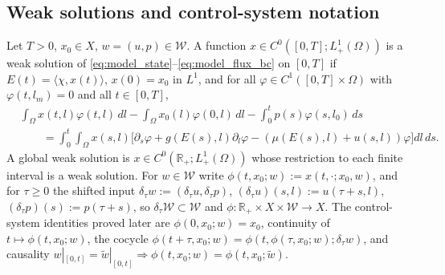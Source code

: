 \documentclass[a4paper,fleqn,longmktitle]{cas-sc}
\theoremstyle{plain}
\theoremstyle{definition}
\theoremstyle{remark}
\numberwithin{equation}{section}
\begin{document}
\subsection{Weak solutions and control-system notation}
\label{subsec:weak_solutions}
Let \(T>0\), \(x_0\in X\), \(w=(u,p)\in\mathcal W\). A function
\(x\in C^0([0,T];L^1_+(\Omega))\) is a weak solution of
\eqref{eq:model_state}--\eqref{eq:model_flux_bc} on \([0,T]\) if
\(E(t)=\langle\chi,x(t)\rangle\), \(x(0)=x_0\) in \(L^1\), and for all
\(\varphi\in C^1([0,T]\times\Omega)\) with \(\varphi(t,l_m)=0\) and all
\(t\in[0,T]\),
\begin{equation}
    \label{eq:model_weak_solution}
    \begin{aligned}
    &\int_\Omega x(t,l)\varphi(t,l)\,dl
    -
    \int_\Omega x_0(l)\varphi(0,l)\,dl
    -
    \int_0^t p(s)\varphi(s,l_0)\,ds
    \\
    &\qquad =
    \int_0^t\!\!\int_\Omega
    x(s,l)
    \big[
        \partial_s\varphi
        +
        g(E(s),l)\partial_l\varphi
        -
        (\mu(E(s),l)+u(s,l))\varphi
    \big]dl\,ds .
    \end{aligned}
\end{equation}
A global weak solution is \(x\in C^0(\mathbb R_+;L^1_+(\Omega))\) whose
restriction to each finite interval is a weak solution. For \(w\in\mathcal W\)
write \(\phi(t,x_0;w):=x(t,\cdot;x_0,w)\), and for \(\tau\ge0\) the shifted
input \(\delta_\tau w:=(\delta_\tau u,\delta_\tau p)\),
\((\delta_\tau u)(s,l):=u(\tau+s,l)\), \((\delta_\tau p)(s):=p(\tau+s)\), so
\(\delta_\tau\mathcal W\subset\mathcal W\) and
\(\phi:\mathbb R_+\times X\times\mathcal W\to X\). The control-system identities
proved later are \(\phi(0,x_0;w)=x_0\), continuity of
\(t\mapsto\phi(t,x_0;w)\), the cocycle
\(\phi(t+\tau,x_0;w)=\phi(t,\phi(\tau,x_0;w);\delta_\tau w)\), and causality
\(w|_{[0,t]}=\widetilde w|_{[0,t]}\Rightarrow\phi(t,x_0;w)=\phi(t,x_0;\widetilde w)\).
\end{document}

